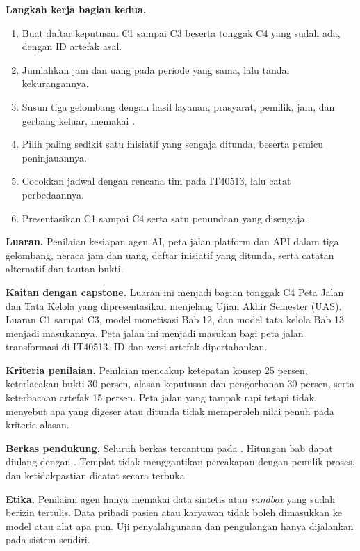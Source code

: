 \textbf{Langkah kerja bagian kedua.}
\begin{enumerate}
  \item Buat daftar keputusan C1 sampai C3 beserta tonggak C4 yang sudah ada, dengan ID artefak asal.
  \item Jumlahkan jam dan uang pada periode yang sama, lalu tandai kekurangannya.
  \item Susun tiga gelombang dengan hasil layanan, prasyarat, pemilik, jam, dan gerbang keluar, memakai .
  \item Pilih paling sedikit satu inisiatif yang sengaja ditunda, beserta pemicu peninjauannya.
  \item Cocokkan jadwal dengan rencana tim pada IT40513, lalu catat perbedaannya.
  \item Presentasikan C1 sampai C4 serta satu penundaan yang disengaja.
\end{enumerate}

\textbf{Luaran.} Penilaian kesiapan agen AI, peta jalan platform dan API dalam tiga gelombang, neraca jam dan uang, daftar inisiatif yang ditunda, serta catatan alternatif dan tautan bukti.

\textbf{Kaitan dengan capstone.} Luaran ini menjadi bagian tonggak C4 Peta Jalan dan Tata Kelola yang dipresentasikan menjelang Ujian Akhir Semester (UAS). Luaran C1 sampai C3, model monetisasi Bab 12, dan model tata kelola Bab 13 menjadi masukannya. Peta jalan ini menjadi masukan bagi peta jalan transformasi di IT40513. ID dan versi artefak dipertahankan.

\textbf{Kriteria penilaian.} Penilaian mencakup ketepatan konsep 25 persen, keterlacakan bukti 30 persen, alasan keputusan dan pengorbanan 30 persen, serta keterbacaan artefak 15 persen. Peta jalan yang tampak rapi tetapi tidak menyebut apa yang digeser atau ditunda tidak memperoleh nilai penuh pada kriteria alasan.

\textbf{Berkas pendukung.} Seluruh berkas tercantum pada . Hitungan bab dapat diulang dengan . Templat tidak menggantikan percakapan dengan pemilik proses, dan ketidakpastian dicatat secara terbuka.

\textbf{Etika.} Penilaian agen hanya memakai data sintetis atau \textit{sandbox} yang sudah berizin tertulis. Data pribadi pasien atau karyawan tidak boleh dimasukkan ke model atau alat apa pun. Uji penyalahgunaan dan pengulangan hanya dijalankan pada sistem sendiri.

